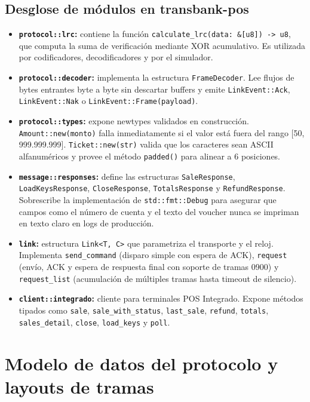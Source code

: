 \documentclass{../../plantilla/raysac-informe}
\begin{document}
\subsection{Desglose de módulos en transbank-pos}
\begin{itemize}
  \item \textbf{\texttt{protocol::lrc}:} contiene la función \texttt{calculate\_lrc(data: \&[u8]) -> u8},
    que computa la suma de verificación mediante XOR acumulativo. Es utilizada por codificadores,
    decodificadores y por el simulador.
  \item \textbf{\texttt{protocol::decoder}:} implementa la estructura \texttt{FrameDecoder}. Lee flujos de
    bytes entrantes byte a byte sin descartar buffers y emite \texttt{LinkEvent::Ack}, \texttt{LinkEvent::Nak}
    o \texttt{LinkEvent::Frame(payload)}.
  \item \textbf{\texttt{protocol::types}:} expone newtypes validados en construcción. \texttt{Amount::new(monto)}
    falla inmediatamente si el valor está fuera del rango [50, 999.999.999]. \texttt{Ticket::new(str)} valida
    que los caracteres sean ASCII alfanuméricos y provee el método \texttt{padded()} para alinear a 6 posiciones.
  \item \textbf{\texttt{message::responses}:} define las estructuras \texttt{SaleResponse}, \texttt{LoadKeysResponse},
    \texttt{CloseResponse}, \texttt{TotalsResponse} y \texttt{RefundResponse}. Sobrescribe la implementación de
    \texttt{std::fmt::Debug} para asegurar que campos como el número de cuenta y el texto del voucher nunca
    se impriman en texto claro en logs de producción.
  \item \textbf{\texttt{link}:} estructura \texttt{Link<T, C>} que parametriza el transporte y el reloj.
    Implementa \texttt{send\_command} (disparo simple con espera de ACK), \texttt{request} (envío, ACK y espera
    de respuesta final con soporte de tramas 0900) y \texttt{request\_list} (acumulación de múltiples tramas
    hasta timeout de silencio).
  \item \textbf{\texttt{client::integrado}:} cliente para terminales POS Integrado. Expone métodos tipados
    como \texttt{sale}, \texttt{sale\_with\_status}, \texttt{last\_sale}, \texttt{refund}, \texttt{totals},
    \texttt{sales\_detail}, \texttt{close}, \texttt{load\_keys} y \texttt{poll}.
\end{itemize}

\clearpage
\section{Modelo de datos del protocolo y layouts de tramas}
\end{document}
